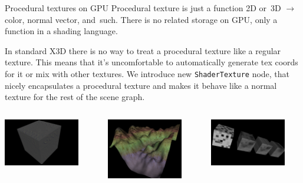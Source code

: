 \documentclass{beamer}
\begin{document}
\begin{frame}[fragile]{Procedural textures on GPU}
Procedural texture is just a function 2D or~3D $\rightarrow$
color, normal vector, and~such.
There is no related storage on GPU, only a function
in a shading language.

\vspace{0.1in}

In standard X3D there is no way to treat a procedural texture
like a regular texture. This means that it's uncomfortable
to automatically generate tex coords for it or mix with other textures.
We introduce new \texttt{ShaderTexture} node, that nicely
encapsulates a procedural texture and makes it behave like a normal texture
for the rest of the scene graph.

\begin{center}
\begin{columns}[T]
  \begin{column}{1in}
    \includegraphics[width=1.3in]{../shader_texture_edge_detection}
  \end{column}
  \begin{column}{1in}
    \includegraphics[width=1.3in]{../terrain}
  \end{column}
  \begin{column}{1in}
    \includegraphics[width=1.3in]{../noise}
  \end{column}
\end{columns}
\end{center}

\end{frame}
\end{document}
